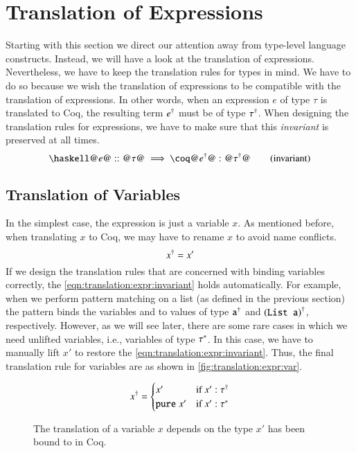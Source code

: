 \section{Translation of Expressions} \label{sec:translation:expr}
Starting with this section we direct our attention away from type-level language constructs.
Instead, we will have a look at the translation of expressions.
Nevertheless, we have to keep the translation rules for types in mind.
We have to do so because we wish the translation of expressions to be compatible with the translation of expressions.
In other words, when an expression $e$ of type $\tau$ is translated to Coq, the resulting term ${e}^{\dagger}$ must be of type ${\tau}^{\dagger}$.
When designing the translation rules for expressions, we have to make sure that this \textit{invariant} is preserved at all times.
\[
  \haskellM{@$e$@ :: @$\tau$@}
  \implies \coqM{@$\toCoqX{e}$@ : @$\toCoqX{\tau}$@}
  \tag{invariant}
  \label{eqn:translation:expr:invariant}
\]

\subsection{Translation of Variables} \label{sec:translation:expr:vars}
In the simplest case, the expression is just a variable $x$.
As mentioned before, when translating $x$ to Coq, we may have to rename $x$ to avoid name conflicts.
\[
  {x}^{\dagger} = x'
\]
If we design the translation rules that are concerned with binding variables correctly, the \ref{eqn:translation:expr:invariant} holds automatically.
For example, when we perform pattern matching on a list (as defined in the previous section) the pattern  binds the variables  and  to values of type ${\texttt{a}}^{\dagger}$ and ${(\texttt{List a})}^{\dagger}$, respectively.
However, as we will see later, there are some rare cases in which we need unlifted variables, i.e., variables of type ${\tau}^{*}$.
In this case, we have to manually lift $x'$ to restore the \ref{eqn:translation:expr:invariant}.
Thus, the final translation rule for variables are as shown in \autoref{fig:translation:expr:var}.

\begin{figure}[H]
  \[
    {x}^{\dagger} = \begin{cases}
      x'        &\text{if } x' : {\tau}^{\dagger} \\
      \texttt{pure}\;{x'} &\text{if } x' : {\tau}^{*}
    \end{cases}
  \]
  \caption{The translation of a variable $x$ depends on the type $x'$ has been bound to in Coq.}
  \label{fig:translation:expr:var}
\end{figure}

